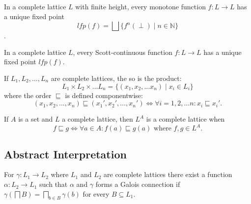 \begin{theorem}\label{thm:kleene_finite}
    In a complete lattice $L$ with finite height, every monotone function $f : L \rightarrow L$ has a unique fixed point
    \begin{equation*}
        lfp(f) = \bigsqcup\{f^n(\perp) \mid n \in \mathbb{N}\}
    \end{equation*}.
\end{theorem}

\begin{theorem}\label{thm:kleene_scott}
    In a complete lattice $L$, every Scott-continuous function $f : L \rightarrow L$ has a unique fixed point $lfp(f)$.
\end{theorem}

\begin{theorem}
    If $L_1, L_2, \dots, L_n$ are complete lattices, the so is the product:
    \begin{equation*}
        L_1 \times L_2 \times \dots L_n = \{(x_1, x_2, \dots x_n) \mid x_i \in L_i\}
    \end{equation*}
    where the order $\sqsubseteq$ is defined componentwise:
    \begin{equation*}
        (x_1, x_2, \dots, x_n) \sqsubseteq (x_1', x_2', \dots, x_n')
        \iff
        \forall i = 1, 2, \dots n : x_i \sqsubseteq x_i'.
    \end{equation*}
\end{theorem}

\begin{theorem}
    If $A$ is a set and $L$ a complete lattice, then $L^A$ is a complete lattice when
    \begin{equation}
        f \sqsubseteq g \iff \forall a \in A : f(a) \sqsubseteq g(a) \text{ where } f,g \in L^A.
    \end{equation}

\end{theorem}


\subsection{Abstract Interpretation}

\begin{theorem}\label{thm:galoispre}
    For $\gamma : L_1 \rightarrow L_2$ where $L_1$ and $L_2$ are complete lattices there exist a function $\alpha : L_2 \rightarrow L_1$ such that $\alpha$ and $\gamma$ forms a Galois connection if $\gamma(\bigsqcap B) = \bigsqcap_{b \in B}\gamma(b)$ for every $B \subseteq L_1$.
\end{theorem}

